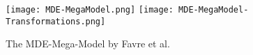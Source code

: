 \begin{figure}
\centering
\texttt{[image: MDE-MegaModel.png]}
\texttt{[image: MDE-MegaModel-Transformations.png]}
\caption{The MDE-Mega-Model by Favre et al. \cite{TowardsAMegamodel}}
\label{fig:TheMDEMegaModel}
\end{figure}